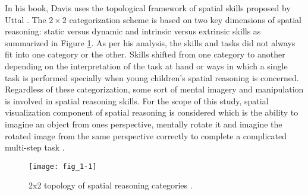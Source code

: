 In his book, Davis \parencite{davis2015spatial} uses the topological framework of spatial skills proposed by Uttal \parencite{uttal2013malleability}. The $ 2 \times 2 $ categorization scheme is based on two key dimensions of spatial reasoning: static versus dynamic and intrinsic versus extrinsic skills as summarized in Figure \ref{fig:fig_2-1}. As per his analysis, the skills and tasks did not always fit into one category or the other. Skills shifted from one category to another depending on the interpretation of the task at hand or ways in which a single task is performed specially when young children's spatial reasoning is concerned. \\
Regardless of these categorization, some sort of mental imagery and manipulation is involved in spatial reasoning skills. For the scope of this study, spatial visualization component of spatial reasoning is considered which is the ability to imagine an object from one\textquotesingle s perspective, mentally rotate it and imagine the rotated image from the same perspective correctly to complete a complicated multi-step task \parencite{linn1986}.
\begin{figure}[t] %
   \centering
   \texttt{[image: fig\_1-1]}
   \caption[{2x2 topology of spatial reasoning categories}]{2x2 topology of spatial reasoning categories \parencite{davis2015spatial}.}
   \label{fig:fig_2-1}
\end{figure}


